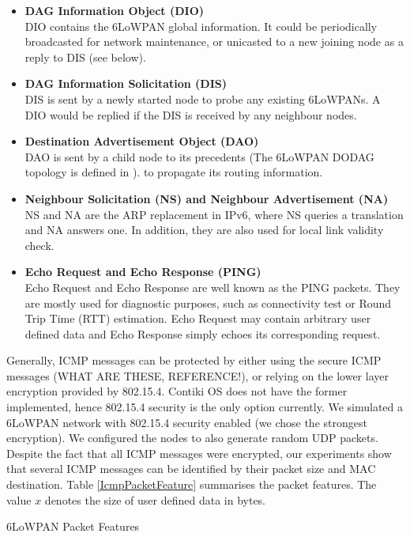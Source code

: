 \documentclass{article}
\begin{document}
\begin{itemize}
	\item \textbf{DAG Information Object (DIO)} \\
	DIO contains the 6LoWPAN global information. It could be periodically broadcasted for network maintenance, or unicasted to a new joining node as a reply to DIS (see below).
	\item \textbf{DAG Information Solicitation (DIS)} \\
	DIS is sent by a newly started node to probe any existing 6LoWPANs. A DIO would be replied if the DIS is received by any neighbour nodes.
	\item \textbf{Destination Advertisement Object (DAO)} \\
	DAO is sent by a child node to its precedents (The 6LoWPAN DODAG topology is defined in \cite{rfc6550}). to propagate its routing information.
	\item \textbf{Neighbour Solicitation (NS) and Neighbour Advertisement (NA)} \\
	NS and NA are the ARP replacement in IPv6, where NS queries a translation and NA answers one. In addition, they are also used for local link validity check.
	\item \textbf{Echo Request and Echo Response (PING)} \\
	Echo Request and Echo Response are well known as the PING packets. They are mostly used for diagnostic purposes, such as connectivity test or Round Trip Time (RTT) estimation. Echo Request may contain arbitrary user defined data and Echo Response simply echoes its corresponding request.
\end{itemize}

Generally, ICMP messages can be protected by either using the secure ICMP messages (WHAT ARE THESE, REFERENCE!), or relying on the lower layer encryption provided by 802.15.4. Contiki OS does not have the former implemented, hence 802.15.4 security is the only option currently. We simulated a 6LoWPAN network with 802.15.4 security enabled (we chose the strongest encryption). We configured the nodes to also generate random UDP packets. Despite the fact that all ICMP messages were encrypted, our experiments show that several ICMP messages can be identified by their packet size and MAC destination. Table \ref{IcmpPacketFeature} summarises the packet features. The value $x$ denotes the size of user defined data in bytes.

\begin{table}
	\center
	
	\caption{6LoWPAN Packet Features\label{IcmpPacketFeature}}
\end{table}
\end{document}
